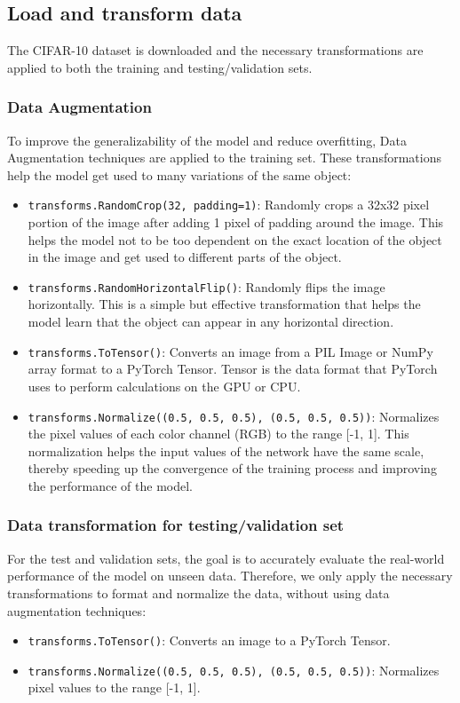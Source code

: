 \documentclass[12pt]{article}
\begin{document}
\subsection{Load and transform data}
The CIFAR-10 dataset is downloaded and the necessary transformations are applied to both the training and testing/validation sets.

\subsubsection{Data Augmentation}
To improve the generalizability of the model and reduce overfitting, Data Augmentation techniques are applied to the training set. These transformations help the model get used to many variations of the same object:
\begin{itemize}
    \item \texttt{transforms.RandomCrop(32, padding=1)}: Randomly crops a 32x32 pixel portion of the image after adding 1 pixel of padding around the image. This helps the model not to be too dependent on the exact location of the object in the image and get used to different parts of the object.
    \item \texttt{transforms.RandomHorizontalFlip()}: Randomly flips the image horizontally. This is a simple but effective transformation that helps the model learn that the object can appear in any horizontal direction.
    \item \texttt{transforms.ToTensor()}: Converts an image from a PIL Image or NumPy array format to a PyTorch Tensor. Tensor is the data format that PyTorch uses to perform calculations on the GPU or CPU.
    \item \texttt{transforms.Normalize((0.5, 0.5, 0.5), (0.5, 0.5, 0.5))}: Normalizes the pixel values of each color channel (RGB) to the range [-1, 1]. This normalization helps the input values of the network have the same scale, thereby speeding up the convergence of the training process and improving the performance of the model.
\end{itemize}

\subsubsection{Data transformation for testing/validation set}
For the test and validation sets, the goal is to accurately evaluate the real-world performance of the model on unseen data. Therefore, we only apply the necessary transformations to format and normalize the data, without using data augmentation techniques:
\begin{itemize}
    \item \texttt{transforms.ToTensor()}: Converts an image to a PyTorch Tensor.
    \item \texttt{transforms.Normalize((0.5, 0.5, 0.5), (0.5, 0.5, 0.5))}: Normalizes pixel values to the range [-1, 1].
\end{itemize}
\end{document}
